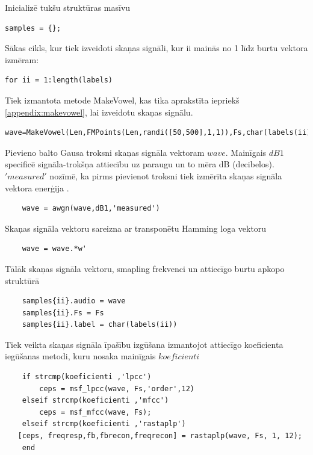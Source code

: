 \documentclass[12pt,paper=A4]{report}
\begin{document}
Inicializē tukšu struktūras masīvu 
\begin{lstlisting}
samples = {};
\end{lstlisting}
 

Sākas cikls, kur tiek izveidoti skaņas signāli, kur ii mainās no 1 līdz burtu vektora izmēram: 
\begin{lstlisting}
for ii = 1:length(labels)
\end{lstlisting}



Tiek izmantota metode MakeVowel, kas tika aprakstīta iepriekš \ref{appendix:makevowel}, lai izveidotu skaņas signālu.      
\begin{lstlisting}
wave=MakeVowel(Len,FMPoints(Len,randi([50,500],1,1)),Fs,char(labels(ii)))
\end{lstlisting}



    Pievieno balto Gausa troksni skaņas signāla vektoram $wave$. Mainīgais $dB1$ specificē signāla-trokšņa attiecību uz paraugu un to mēra dB (decibelos). $'measured'$ nozīmē, ka pirms pievienot troksni tiek izmērīta skaņas signāla vektora enerģija  \cite{dtw37}. 
\begin{lstlisting}
    wave = awgn(wave,dB1,'measured')
\end{lstlisting}
    
   
Skaņas signāla vektoru sareizna ar transponētu Hamming loga vektoru 
\begin{lstlisting}
    wave = wave.*w'
\end{lstlisting}


    
Tālāk skaņas signāla vektoru, smapling frekvenci un attiecīgo burtu apkopo struktūrā    
\begin{lstlisting}
    samples{ii}.audio = wave
    samples{ii}.Fs = Fs
    samples{ii}.label = char(labels(ii))
\end{lstlisting}


    
Tiek veikta skaņas signāla īpašību izgūšana izmantojot attiecīgo koeficienta iegūšanas metodi, kuru nosaka mainīgais $koeficienti$ 
\begin{lstlisting}
    if strcmp(koeficienti ,'lpcc')
        ceps = msf_lpcc(wave, Fs,'order',12)
    elseif strcmp(koeficienti ,'mfcc')
        ceps = msf_mfcc(wave, Fs);
    elseif strcmp(koeficienti ,'rastaplp')
   [ceps, freqresp,fb,fbrecon,freqrecon] = rastaplp(wave, Fs, 1, 12);
    end
\end{lstlisting}
   
\end{document}
